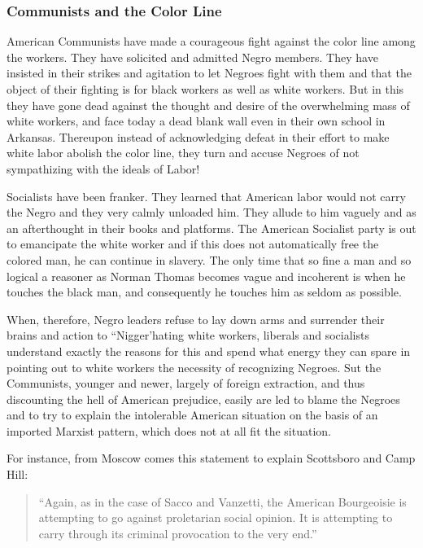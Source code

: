 \documentclass[letterpaper,10pt,english]{jupyterBook}
\begin{document}
\subsubsection{Communists and the Color Line}
\label{\detokenize{Volumes/38/09/negro_and_communism:communists-and-the-color-line}}
\sphinxAtStartPar
American Communists have made a courageous fight against the color line among the workers. They have solicited and admitted Negro members. They have insisted in their strikes and agitation to let Negroes fight with them and that the object of their fighting is for black workers as well as white workers. But in this they have gone dead against the thought and desire of the overwhelming mass of white workers, and face today a dead blank wall even in their own school in Arkansas. Thereupon instead of acknowledging defeat in their effort to make white labor abolish the color line, they turn and accuse Negroes of not sympathizing with the ideals of Labor!

\sphinxAtStartPar
Socialists have been franker. They learned that American labor would not carry the Negro and they very calmly unloaded him. They allude to him vaguely and as an afterthought in their books and platforms. The American Socialist party is out to emancipate the white worker and if this does not automatically free the colored man, he can continue in slavery. The only time that so fine a man and so logical a reasoner as Norman Thomas becomes vague and incoherent is when he touches the black man, and consequently he touches him as seldom as possible.

\sphinxAtStartPar
When, therefore, Negro leaders refuse to lay down arms and surrender their brains and action to “Nigger’hating white workers, liberals and socialists understand exactly the reasons for this and spend what energy they can spare in pointing out to white workers the necessity of recognizing Negroes. Sut the Communists, younger and newer, largely of foreign extraction, and thus discounting the hell of American prejudice, easily are led to blame the Negroes and to try to explain the intolerable American situation on the basis of an imported Marxist pattern, which does not at all fit the situation.

\sphinxAtStartPar
For instance, from Moscow comes this statement to explain Scottsboro and Camp Hill:
\begin{quote}

\sphinxAtStartPar
“Again, as in the case of Sacco and Vanzetti, the American Bourgeoisie is attempting to go against proletarian social opinion. It is attempting to carry through its criminal provocation to the very end.”
\end{quote}
\end{document}
